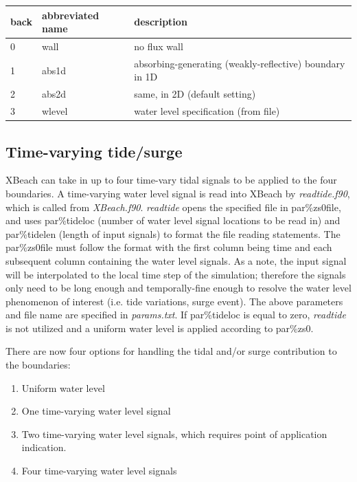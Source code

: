 \begin{tabular}{|p{0.5in}|p{0.8in}|p{2.6in}|} \hline 
\textbf{back} & abbreviated name & description \\ \hline 
0 & wall & no flux wall \\ \hline 
1 & abs1d & absorbing-generating (weakly-reflective) boundary in 1D \\ \hline 
2 & abs2d & same, in 2D (default setting) \\ \hline 
3 & wlevel & water level specification (from file) \\ \hline 
\end{tabular}


\subsection{ Time-varying tide/surge}

XBeach can take in up to four time-vary tidal signals to be applied to the four boundaries.  A time-varying water level signal is read into XBeach by \textit{readtide.f90}, which is called from \textit{XBeach.f90}. \textit{readtide} opens the specified file in par\%zs0file, and uses par\%tideloc (number of water level signal locations to be read in) and par\%tidelen (length of input signals) to format the file reading statements.  The par\%zs0file must follow the format with the first column being time and each subsequent column containing the water level signals.  As a note, the input signal will be interpolated to the local time step of the simulation; therefore the signals only need to be long enough and temporally-fine enough to resolve the water level phenomenon of interest (i.e. tide variations, surge event). The above parameters and file name are specified in \textit{params.txt}.  If par\%tideloc is equal to zero, \textit{readtide} is not utilized and a uniform water level is applied according to par\%zs0.      

There are now four options for handling the tidal and/or surge contribution to the boundaries:

\begin{enumerate}
\item  Uniform water level

\item  One time-varying water level signal

\item  Two time-varying water level signals, which requires point of application indication.

\item  Four time-varying water level signals
\end{enumerate}

